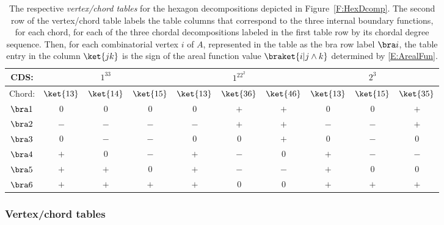 \documentclass[12pt]{amsart}
\theoremstyle{plain}
\theoremstyle{definition}
\numberwithin{equation}{section}
\begin{document}
\renewcommand{\arraystretch}{1.5}
\begin{table}[hbt]
\begin{tabular}{||c||c|c|c||c|c|c||c|c|c||}
\hline
CDS:
&\multicolumn{3}{|c||}{$1^33$}
&\multicolumn{3}{|c||}{$1^22^2$}
&\multicolumn{3}{|c||}{$2^3$}
\\
\hline
Chord:
 &$\ket{13}$ &$\ket{14}$ &$\ket{15}$
 &$\ket{13}$ &$\ket{36}$ &$\ket{46}$
 &$\ket{13}$ &$\ket{15}$ &$\ket{35}$
\\
\hline
$\bra 1$
&$0$ &$0$ &$0$
&$0$ &$+$ &$+$
&$0$ &$0$ &$+$
\\
\hline
$\bra 2$
&$-$ &$-$ &$-$
&$-$ &$+$ &$+$
&$-$ &$-$ &$+$
\\
\hline
$\bra 3$
&$0$ &$-$ &$-$
&$0$ &$0$ &$+$
&$0$ &$-$ &$0$
\\
\hline
$\bra 4$
&$+$ &$0$ &$-$
&$+$ &$-$ &$0$
&$+$ &$-$ &$-$
\\
\hline
$\bra 5$
&$+$ &$+$ &$0$
&$+$ &$-$ &$-$
&$+$ &$0$ &$0$
\\
\hline
$\bra 6$
&$+$ &$+$ &$+$
&$+$ &$0$ &$0$
&$+$ &$+$ &$+$
\\
\hline
\end{tabular}
\vskip 2mm
\caption{The respective \emph{vertex/chord tables} for the hexagon decompositions depicted in Figure~\ref{F:HexDcomp}. The second row of the vertex/chord table labels the table columns that correspond to the three internal boundary functions, for each chord, for each of the three chordal decompositions labeled in the first table row by its chordal degree sequence. Then, for each combinatorial vertex $i$ of $A$, represented in the table as the bra row label $\bra i$, the table entry in the column $\ket{jk}$ is the sign of the areal function value $\braket{i|j\wedge k}$ determined by \eqref{E:ArealFun}.}
\label{T:vertchrd}
\end{table}


\subsubsection{Vertex/chord tables}\label{SSS:VerChTab}
\end{document}
